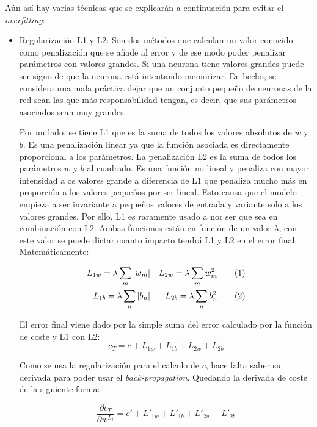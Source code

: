 Aún así hay varias técnicas que se explicarán a continuación para evitar el \textit{overfitting}: 
\begin{itemize}
    \item Regularización L1 y L2:
    Son dos métodos que calculan un valor conocido como penalización que se añade al error y de ese modo poder penalizar parámetros con valores grandes. Si una neurona tiene valores grandes puede ser signo de que la neurona está intentando memorizar. De hecho, se considera una mala práctica dejar que un conjunto pequeño de neuronas de la red sean las que más responsabilidad tengan, es decir, que sus parámetros asociados sean muy grandes.
    \newline
    
    Por un lado, se tiene L1 que es la suma de todos los valores absolutos de $w$ y $b$. Es una penalización linear ya que la función asociada es directamente proporcional a los parámetros. La penalización L2 es la suma de todos los parámetros $w$ y $b$ al cuadrado. Es una función no lineal y penaliza con mayor intensidad a os valores grande a diferencia de L1 que penaliza mucho más en proporción a los valores pequeños por ser lineal. Esto causa que el modelo empieza a ser invariante a pequeños valores de entrada y variante solo a los valores grandes. Por ello, L1 es raramente usado a nor ser que sea en combinación con L2. Ambas funciones están en función de un valor $\lambda$, con este valor se puede dictar cuanto impacto tendrá L1 y L2 en el error final. Matemáticamente:
    
    \begin{align*}
         L_{1w} = \lambda \sum_m |w_m| &&  L_{2w} = \lambda \sum_m w^2_m \addtocounter{equation}{1}\tag{\theequation} \\ 
         L_{1b} =\lambda \sum_n |b_n| && L_{2b} = \lambda \sum_n b^2_n \addtocounter{equation}{1}\tag{\theequation}
    \end{align*}
    

    El error final viene dado por la simple suma del error calculado por la función de coste y L1 con L2:
    \begin{equation}
        c_T = c + L_{1w} + L_{1b} + L_{2w} + L_{2b}
    \end{equation}
    
    Como se usa la regularización para el calculo de $c$, hace falta saber su derivada para poder usar el \textit{back-propagation}. Quedando la derivada de coste de la siguiente forma:
    
    \begin{equation}
        \frac{\partial c_T}{\partial w^{L_i}} = c' + L'_{1w} + L'_{1b} + L'_{2w} + L'_{2b}
    \end{equation}
    

\end{itemize}
